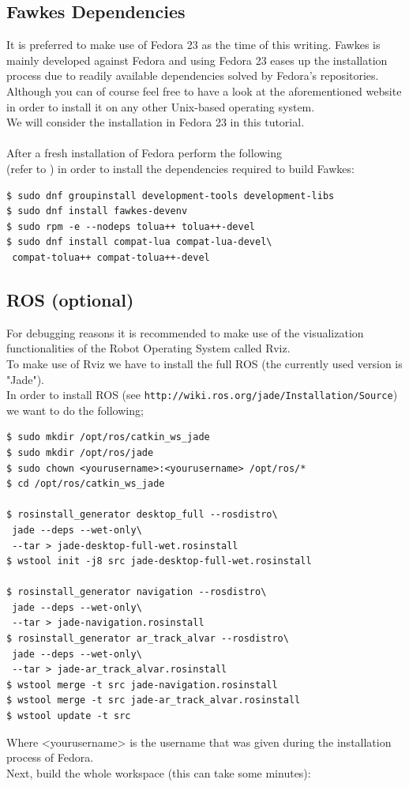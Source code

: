 \documentclass[oribibl]{llncs}
\begin{document}
\subsection{Fawkes Dependencies}
It is preferred to make use of Fedora 23 as the time of this writing. Fawkes is mainly developed against Fedora and using Fedora 23 eases up the installation process due to readily available dependencies solved by Fedora's repositories.\\
Although you can of course feel free to have a look at the aforementioned website in order to install it on any other Unix-based operating system.\\
We will consider the installation in Fedora 23 in this tutorial.\\
\\
After a fresh installation of Fedora perform the following\\(refer to ) in order to install the dependencies required to build Fawkes:
\begin{lstlisting}[frame=single]
$ sudo dnf groupinstall development-tools development-libs
$ sudo dnf install fawkes-devenv
$ sudo rpm -e --nodeps tolua++ tolua++-devel
$ sudo dnf install compat-lua compat-lua-devel\
 compat-tolua++ compat-tolua++-devel
\end{lstlisting}

\subsection{ROS (optional)}
For debugging reasons it is recommended to make use of the visualization functionalities of the Robot Operating System called Rviz.\\
To make use of Rviz we have to install the full ROS (the currently used version is "Jade").\\
In order to install ROS (see \texttt{http://wiki.ros.org/jade/Installation/Source}) we want to do the following;
\begin{lstlisting}[frame=single]
$ sudo mkdir /opt/ros/catkin_ws_jade
$ sudo mkdir /opt/ros/jade
$ sudo chown <yourusername>:<yourusername> /opt/ros/*
$ cd /opt/ros/catkin_ws_jade

$ rosinstall_generator desktop_full --rosdistro\
 jade --deps --wet-only\
 --tar > jade-desktop-full-wet.rosinstall
$ wstool init -j8 src jade-desktop-full-wet.rosinstall

$ rosinstall_generator navigation --rosdistro\
 jade --deps --wet-only\
 --tar > jade-navigation.rosinstall
$ rosinstall_generator ar_track_alvar --rosdistro\
 jade --deps --wet-only\
 --tar > jade-ar_track_alvar.rosinstall
$ wstool merge -t src jade-navigation.rosinstall
$ wstool merge -t src jade-ar_track_alvar.rosinstall
$ wstool update -t src
\end{lstlisting}
Where <yourusername> is the username that was given during the installation process of Fedora.\\
Next, build the whole workspace (this can take some minutes):
\end{document}
